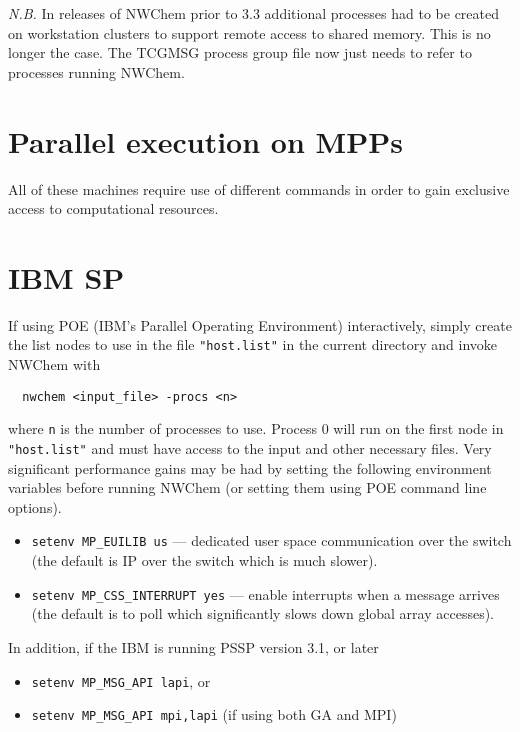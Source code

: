{\em N.B.}  In releases of NWChem prior to 3.3 additional processes
had to be created on workstation clusters to support remote access to
shared memory.  This is no longer the case.  The TCGMSG process group
file now just needs to refer to processes running NWChem.

\section{Parallel execution on MPPs}

All of these machines require use of different commands in order to
gain exclusive access to computational resources.


\section{IBM SP}

If using POE (IBM's Parallel Operating Environment) interactively,
simply create the list nodes to use in the file \verb+"host.list"+ in
the current directory and invoke NWChem with
\begin{verbatim}
  nwchem <input_file> -procs <n>
\end{verbatim}
where \verb+n+ is the number of processes to use.  Process 0 will run
on the first node in \verb+"host.list"+ and must have access to the
input and other necessary files.  Very significant performance gains
may be had by setting the following environment variables before
running NWChem (or setting them using POE command line options).
\begin{itemize}
\item \verb+setenv MP_EUILIB us+ --- dedicated user space
  communication over the switch (the default is IP over the switch
  which is much slower).
\item \verb+setenv MP_CSS_INTERRUPT yes+ --- enable interrupts when a 
  message arrives (the default is to poll which significantly slows
  down global array accesses).
\end{itemize}
In addition, if the IBM is running PSSP version 3.1, or later
\begin{itemize}
\item \verb+setenv MP_MSG_API lapi+, or 
\item \verb+setenv MP_MSG_API mpi,lapi+ (if using both GA and MPI) 
\end{itemize}

